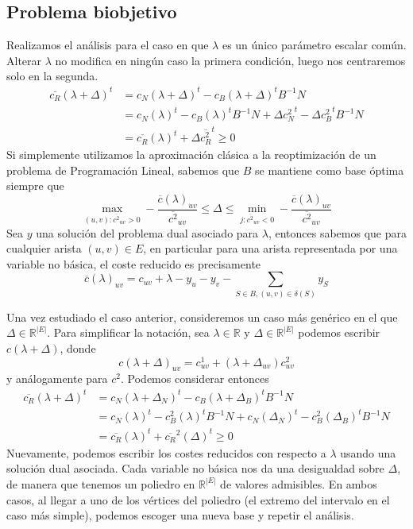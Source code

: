 \documentclass[twoside,a4paper,openright,12pt]{book}
\newcommand{\R}{\mathbb{R}}
\begin{document}
\subsection{Problema biobjetivo}
Realizamos el análisis para el caso en que $\lambda$ es un único parámetro escalar común. Alterar $\lambda$ no modifica en ningún caso la primera condición, luego nos centraremos solo en la segunda. 
\begin{align*}
\overline{c_R}(\lambda+\Delta)^t&= c_N(\lambda + \Delta)^t  - c_B(\lambda + \Delta)^t B^{-1}N \\
& = c_N(\lambda)^t  - c_B(\lambda)^t B^{-1}N + \Delta {c_N^2}^t  - \Delta {c_B^2}^t B^{-1}N \\
&= \overline{c_R}(\lambda)^t + \Delta \overline{c_R^2}^t \geq 0
\end{align*}
Si simplemente utilizamos la aproximación clásica a la reoptimización de un problema de Programación Lineal, sabemos que $B$ se mantiene como base óptima siempre que
$$
\max_{(u,v):\overline{c^2}_{uv}>0} -\frac{\overline{c}(\lambda)_{uv}}{\overline{c^2}_{uv}} \leq \Delta \leq \min_{j:\overline{c^2}_{uv}<0} - \frac{\overline{c}(\lambda)_{uv}}{\overline{c^2}_{uv}}
$$
Sea $y$ una solución del problema dual asociado para $\lambda$, entonces sabemos que para cualquier arista $(u,v)\in E$, en particular para una arista representada por una variable no básica, el coste reducido es precisamente 
$$
\overline{c}(\lambda)_{uv} =c_{uv}+\lambda-y_u-y_v - \sum_{S\in B, (u,v)\in \delta(S)}y_S
$$

Una vez estudiado el caso anterior, consideremos un caso más genérico en el que $\Delta \in \R^{|E|}$. Para simplificar la notación, sea $\lambda \in \R$ y $\Delta \in \R^{|E|}$ podemos escribir $c(\lambda+\Delta)$, donde
$$
c(\lambda+\Delta)_{uv} = c^1_{uv}+(\lambda+\Delta_{uv})c^2_{uv}
$$
y análogamente para $c^2$. Podemos considerar entonces
\begin{align*}
\overline{c_R}(\lambda+\Delta)^t&= c_N(\lambda + \Delta_N)^t  - c_B(\lambda + \Delta_B)^t B^{-1}N \\
& = c_N(\lambda)^t  - c_B^2(\lambda)^t B^{-1}N + c_N(\Delta_N)^t  - c_B^2(\Delta_B)^t B^{-1}N \\
&=\overline{c_R}(\lambda)^t + \overline{c_R}^2(\Delta)^t \geq 0
\end{align*}
Nuevamente, podemos escribir los costes reducidos con respecto a $\lambda$ usando una solución dual asociada. Cada variable no básica nos da una desigualdad sobre $\Delta$, de manera que tenemos un poliedro en $\R^{|E|}$ de valores admisibles. En ambos casos, al llegar a uno de los vértices del poliedro (el extremo del intervalo en el caso más simple), podemos escoger una nueva base y repetir el análisis.
\end{document}
